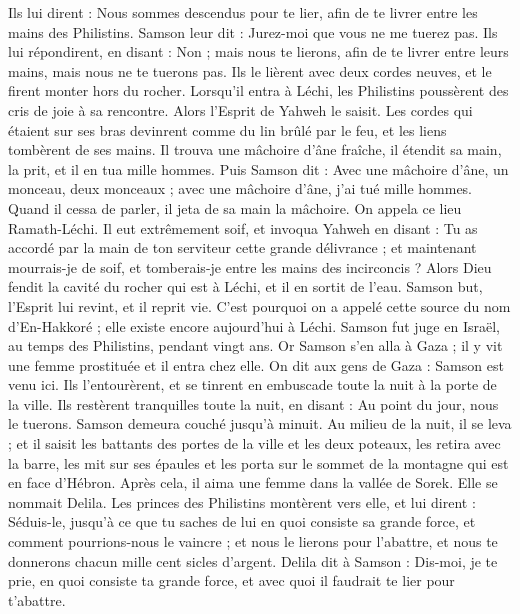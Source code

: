 \begin{multicols}{2}
Ils lui dirent : Nous sommes descendus pour te lier, afin de te livrer entre les mains des Philistins. Samson leur dit : Jurez-moi que vous ne me tuerez pas.
Ils lui répondirent, en disant : Non ; mais nous te lierons, afin de te livrer entre leurs mains, mais nous ne te tuerons pas. Ils le lièrent avec deux cordes neuves, et le firent monter hors du rocher.
Lorsqu'il entra à Léchi, les Philistins poussèrent des cris de joie à sa rencontre. Alors l'Esprit de Yahweh le saisit. Les cordes qui étaient sur ses bras devinrent comme du lin brûlé par le feu, et les liens tombèrent de ses mains.
Il trouva une mâchoire d'âne fraîche, il étendit sa main, la prit, et il en tua mille hommes.
Puis Samson dit : Avec une mâchoire d'âne, un monceau, deux monceaux ; avec une mâchoire d'âne, j'ai tué mille hommes.
Quand il cessa de parler, il jeta de sa main la mâchoire. On appela ce lieu Ramath-Léchi.
Il eut extrêmement soif, et invoqua Yahweh en disant : Tu as accordé par la main de ton serviteur cette grande délivrance ; et maintenant mourrais-je de soif, et tomberais-je entre les mains des incirconcis ?
Alors Dieu fendit la cavité du rocher qui est à Léchi, et il en sortit de l'eau. Samson but, l'Esprit lui revint, et il reprit vie. C'est pourquoi on a appelé cette source du nom d'En-Hakkoré ; elle existe encore aujourd'hui à Léchi.
Samson fut juge en Israël, au temps des Philistins, pendant vingt ans.
\VerseOne{}Or Samson s'en alla à Gaza ; il y vit une femme prostituée et il entra chez elle.
On dit aux gens de Gaza : Samson est venu ici. Ils l'entourèrent, et se tinrent en embuscade toute la nuit à la porte de la ville. Ils restèrent tranquilles toute la nuit, en disant : Au point du jour, nous le tuerons.
Samson demeura couché jusqu'à minuit. Au milieu de la nuit, il se leva ; et il saisit les battants des portes de la ville et les deux poteaux, les retira avec la barre, les mit sur ses épaules et les porta sur le sommet de la montagne qui est en face d'Hébron.
Après cela, il aima une femme dans la vallée de Sorek. Elle se nommait Delila.
Les princes des Philistins montèrent vers elle, et lui dirent : Séduis-le, jusqu'à ce que tu saches de lui en quoi consiste sa grande force, et comment pourrions-nous le vaincre ; et nous le lierons pour l'abattre, et nous te donnerons chacun mille cent sicles d'argent.
Delila dit à Samson : Dis-moi, je te prie, en quoi consiste ta grande force, et avec quoi il faudrait te lier pour t'abattre.

\end{multicols}
